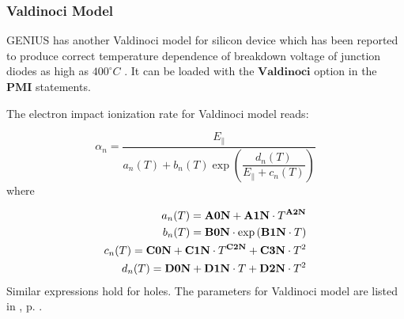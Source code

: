 \documentclass[oneside,12pt]{cgd_book}
\begin{document}
\subsubsection{Valdinoci Model}
GENIUS has another Valdinoci model for silicon device which has been reported to produce correct
          temperature dependence of breakdown voltage of junction diodes as high as
$400^{\circ}C$ \cite[Valdinoci1999]{}. It can be loaded with the
$\mathbf{Valdinoci}$ option in the $\mathbf{PMI}$ statements.
\par
The electron impact ionization rate for Valdinoci model reads:
\par
\begin{equation}
\alpha _n = \frac{E_{\parallel} } { a_n (T) + b_n (T) \exp \left( \dfrac{d_n(T)}{ E_{\parallel}
            + c_n(T)} \right) }
\end{equation}
where
\par
\begin{subequations}
\begin{align}
 a_n(T) = {\bf A0N} + {\bf A1N} \cdot T^{\bf A2N} \\
 b_n(T) = {\bf B0N} \cdot \exp \left( {\bf B1N} \cdot T \right) \\
 c_n (T) = {\bf C0N} + {\bf C1N} \cdot T^{\bf C2N} + {\bf C3N} \cdot T^2 \\
 d_n (T) = {\bf D0N} + {\bf D1N} \cdot T + {\bf D2N} \cdot T^2
\end{align}
\end{subequations}
Similar expressions hold for holes. The parameters for Valdinoci model are listed in
, p. \pageref{tab:Equation:II:Valdinoci:Param}.
\par
\end{document}
